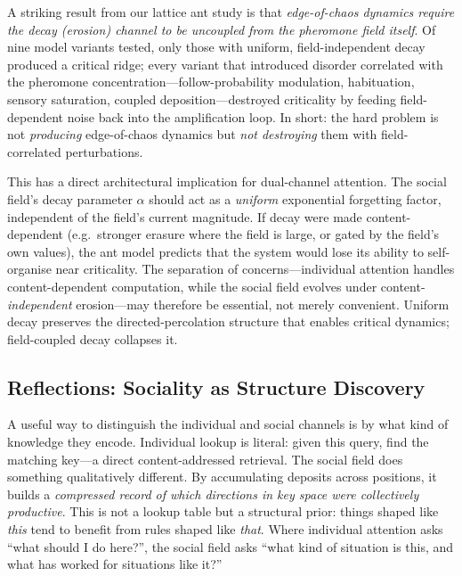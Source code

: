 \documentclass[11pt,a4paper]{article}
\newcommand{\retain}{\alpha}
\begin{document}
A striking result from our lattice ant study is that
\emph{edge-of-chaos dynamics require the decay (erosion) channel to be
uncoupled from the pheromone field itself}.  Of nine model variants
tested, only those with uniform, field-independent decay produced a
critical ridge; every variant that introduced disorder correlated with
the pheromone concentration---follow-probability modulation,
habituation, sensory saturation, coupled deposition---destroyed
criticality by feeding field-dependent noise back into the
amplification loop.  In short: the hard problem is not \emph{producing}
edge-of-chaos dynamics but \emph{not destroying} them with
field-correlated perturbations.

This has a direct architectural implication for dual-channel attention.
The social field's decay parameter $\retain$ should act as a
\emph{uniform} exponential forgetting factor, independent of the
field's current magnitude.  If decay were made content-dependent
(e.g.\ stronger erasure where the field is large, or gated by the
field's own values), the ant model predicts that the system would lose
its ability to self-organise near criticality.  The separation of
concerns---individual attention handles content-dependent computation,
while the social field evolves under content-\emph{independent}
erosion---may therefore be essential, not merely convenient.  Uniform
decay preserves the directed-percolation structure that enables
critical dynamics; field-coupled decay collapses it.


\subsection{Reflections: Sociality as Structure Discovery}

A useful way to distinguish the individual and social channels is by
what kind of knowledge they encode.  Individual lookup is literal: given
this query, find the matching key---a direct content-addressed
retrieval.  The social field does something qualitatively different.  By
accumulating deposits across positions, it builds a \emph{compressed
record of which directions in key space were collectively productive}.
This is not a lookup table but a structural prior: things shaped like
\emph{this} tend to benefit from rules shaped like \emph{that}.  Where
individual attention asks ``what should I do here?'', the social field
asks ``what kind of situation is this, and what has worked for situations
like it?''
\end{document}

